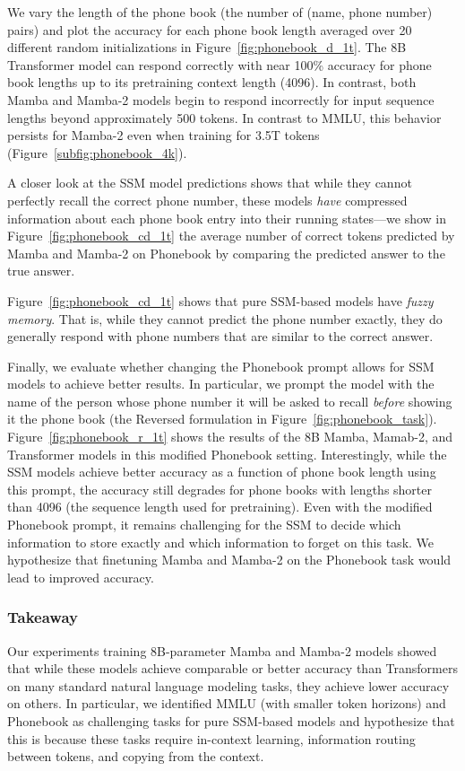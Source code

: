 We vary the length of the phone book (the number of (name, phone number) pairs) and plot the accuracy for each phone book length averaged over 20 different random initializations in Figure~\ref{fig:phonebook_d_1t}. The 8B Transformer model can respond correctly with near 100\% accuracy for phone book lengths up to its pretraining context length (4096). In contrast, both Mamba and Mamba-2 models begin to respond incorrectly for input sequence lengths beyond approximately 500 tokens. In contrast to MMLU, this behavior persists for Mamba-2 even when training for 3.5T tokens (Figure~\ref{subfig:phonebook_4k}).

A closer look at the SSM model predictions shows that while they cannot perfectly recall the correct phone number, these models \textit{have} compressed information about each phone book entry into their running states---we show in Figure~\ref{fig:phonebook_cd_1t} the average number of correct tokens predicted by Mamba and Mamba-2 on Phonebook by comparing the predicted answer to the true answer. 

Figure~\ref{fig:phonebook_cd_1t} shows that pure SSM-based models have \textit{fuzzy memory}. That is, while they cannot predict the phone number exactly, they do generally respond with phone numbers that are similar to the correct answer.

Finally, we evaluate whether changing the Phonebook prompt allows for SSM models to achieve better results. In particular, we prompt the model with the name of the person whose phone number it will be asked to recall \textit{before} showing it the phone book (the Reversed formulation in Figure~\ref{fig:phonebook_task}). 
Figure~\ref{fig:phonebook_r_1t} shows the results of the 8B Mamba, Mamab-2, and Transformer models in this modified Phonebook setting. Interestingly, while the SSM models achieve better accuracy as a function of phone book length using this prompt, the accuracy still degrades for phone books with lengths shorter than 4096 (the sequence length used for pretraining). Even with the modified Phonebook prompt, it remains challenging for the SSM to decide which information to store exactly and which information to forget on this task. We hypothesize that finetuning Mamba and Mamba-2 on the Phonebook task would lead to improved accuracy. 

\subsubsection{Takeaway}
Our experiments training 8B-parameter Mamba and Mamba-2 models showed that while these models achieve comparable or better accuracy than Transformers on many standard natural language modeling tasks, they achieve lower accuracy on others. In particular, we identified MMLU (with smaller token horizons) and Phonebook as challenging tasks for pure SSM-based models and hypothesize that this is because these tasks require in-context learning, information routing between tokens, and copying from the context.

